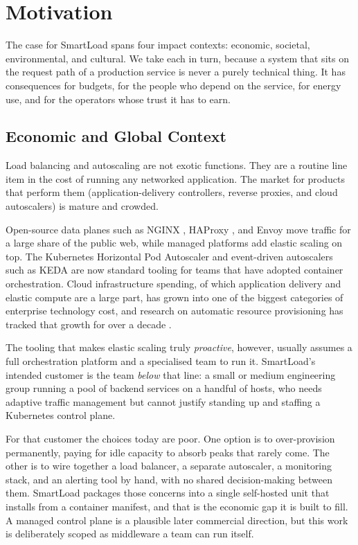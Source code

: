 \section{Motivation}
\label{sec:intro:motivation}

The case for SmartLoad spans four impact contexts: economic, societal,
environmental, and cultural. We take each in turn, because a system that sits on
the request path of a production service is never a purely technical thing. It
has consequences for budgets, for the people who depend on the service, for
energy use, and for the operators whose trust it has to earn.

\subsection{Economic and Global Context}
\label{sec:intro:economic}

Load balancing and autoscaling are not exotic functions. They are a routine line
item in the cost of running any networked application. The market for products
that perform them (application-delivery controllers, reverse proxies, and cloud
autoscalers) is mature and crowded.

Open-source data planes such as NGINX \cite{nginx}, HAProxy \cite{haproxy}, and
Envoy \cite{envoy} move traffic for a large share of the public web, while
managed platforms add elastic scaling on top. The Kubernetes Horizontal Pod
Autoscaler \cite{k8shpa} and event-driven autoscalers such as KEDA \cite{keda}
are now standard tooling for teams that have adopted container orchestration.
Cloud infrastructure spending, of which application delivery and elastic compute
are a large part, has grown into one of the biggest categories of enterprise
technology cost, and research on automatic resource provisioning has tracked that
growth for over a decade \cite{lorido2014autoscaling,roy2011autoscaling}.

The tooling that makes elastic scaling truly \emph{proactive}, however, usually
assumes a full orchestration platform and a specialised team to run it.
SmartLoad's intended customer is the team \emph{below} that line: a small or
medium engineering group running a pool of backend services on a handful of
hosts, who needs adaptive traffic management but cannot justify standing up and
staffing a Kubernetes control plane.

For that customer the choices today are poor. One option is to over-provision
permanently, paying for idle capacity to absorb peaks that rarely come. The other
is to wire together a load balancer, a separate autoscaler, a monitoring stack,
and an alerting tool by hand, with no shared decision-making between them.
SmartLoad packages those concerns into a single self-hosted unit that installs
from a container manifest, and that is the economic gap it is built to fill. A
managed control plane is a plausible later commercial direction, but this work is
deliberately scoped as middleware a team can run itself.

